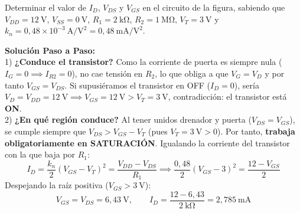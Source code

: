 \begin{ejercicio}
Determinar el valor de $I_D$, $V_{DS}$ y $V_{GS}$ en el circuito de la figura, sabiendo que $V_{DD} = 12\ \si{\volt}$, $V_{SS} = 0\ \si{\volt}$, $R_1 = 2\ \si{\kilo\ohm}$, $R_2 = 1\ \si{\mega\ohm}$, $V_T = 3\ \si{\volt}$ y $k_n = 0{,}48 \times 10^{-3}\ \si{\ampere\per\volt\squared} = 0{,}48\ \si{\milli\ampere\per\volt\squared}$.
\tcbline
\begin{center}
\end{center}
\textbf{Solución Paso a Paso:}\\[4pt]
1) \textbf{¿Conduce el transistor?} Como la corriente de puerta es siempre nula ($I_G = 0 \implies I_{R2} = 0$), no cae tensión en $R_2$, lo que obliga a que $V_G = V_D$ y por tanto \textbf{$V_{GS} = V_{DS}$}. Si supusiéramos el transistor en OFF ($I_D = 0$), sería $V_D = V_{DD} = 12\ \si{\volt} \implies V_{GS} = 12\ \si{\volt} > V_T = 3\ \si{\volt}$, contradicción: el transistor está \textbf{ON}.\\[3pt]
2) \textbf{¿En qué región conduce?} Al tener unidos drenador y puerta ($V_{DS} = V_{GS}$), se cumple siempre que $V_{DS} > V_{GS} - V_T$ (pues $V_T = 3\ \si{\volt} > 0$). Por tanto, \textbf{trabaja obligatoriamente en SATURACIÓN}.
Igualando la corriente del transistor con la que baja por $R_1$:
\begin{equation}
    I_D = \frac{k_n}{2}(V_{GS} - V_T)^2 = \frac{V_{DD} - V_{DS}}{R_1} \implies \frac{0{,}48}{2}(V_{GS} - 3)^2 = \frac{12 - V_{GS}}{2}
\end{equation}
Despejando la raíz positiva ($V_{GS} > 3\ \si{\volt}$):
\begin{equation}
    V_{GS} = V_{DS} = 6{,}43\ \si{\volt}, \qquad I_D = \frac{12 - 6{,}43}{2\ \si{\kilo\ohm}} = 2{,}785\ \si{\milli\ampere}
\end{equation}
\end{ejercicio}


